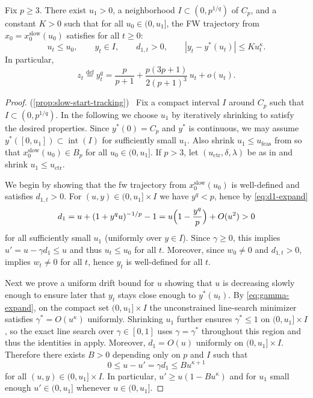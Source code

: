 \documentclass{article}
\newcommand\linktoproof[1]{{\hspace{-0.3em}\normalfont[{\hyperlink{proof:#1}{$\downarrow$}}]}}
\newcommand{\defi}{\stackrel{\mathrm{\scriptscriptstyle def}}{=}}
\newcommand{\newtarget}[1]{\hypertarget{#1}{}}
\newcommand\linkofproof[1]{(\cref{#1})\newtarget{proof:#1}\ }
\begin{document}
\begin{proposition}\label{prop:slow-start-tracking}\linktoproof{prop:slow-start-tracking}
    Fix $p\ge 3$.
    There exist $u_1>0$, a neighborhood $I\subset(0,p^{1/q})$ of $C_p$, and a constant
    $K>0$ such that for all $u_0\in(0,u_1]$, the FW trajectory from
    $x_0=x_0^{\mathrm{slow}}(u_0)$ satisfies for all $t\ge 0$:
    \[
        u_t\le u_0,\qquad y_t\in I,\qquad d_{1,t}>0,
        \qquad
        |y_t-y^*(u_t)| \le K u_t^\kappa.
    \]
    In particular,
    \begin{equation}
        \label{eq:z-drift-slow-start}
        z_t \defi y_t^q
        = \frac{p}{p+1} + \frac{p(3p+1)}{2(p+1)^3}\,u_t + o(u_t).
    \end{equation}
\end{proposition}

\begin{proof}\linkofproof{prop:slow-start-tracking}
    Fix a compact interval $I$ around $C_p$ such that $I\subset(0,p^{1/q})$.
    In the following we choose $u_1$ by iteratively shrinking to satisfy the desired properties.
    Since $y^*(0)=C_p$ and $y^*$ is continuous, we may assume $y^*([0,u_1])\subset \operatorname{int}(I)$ for sufficiently small $u_1$.
    Also shrink $u_1\le u_{\mathrm{feas}}$ from  so
    that $x_0^{\mathrm{slow}}(u_0)\in B_p$ for all $u_0\in(0,u_1]$.
    If $p>3$, let $(u_{\mathrm{ctr}},\delta,\lambda)$ be as in
     and shrink $u_1\le u_{\mathrm{ctr}}$.

    We begin by showing that the \gls{fw} trajectory from $x_0^{\mathrm{slow}}(u_0)$ is well-defined
    and satisfies $d_{1,t}>0$.
    For $(u,y)\in(0,u_1]\times I$ we have $y^q<p$, hence by \eqref{eq:d1-expand}
    \[
        d_1 = u+(1+y^q u)^{-1/p}-1 = u\Bigl(1-\frac{y^q}{p}\Bigr)+O(u^2)>0
    \]
    for all sufficiently small $u_1$ (uniformly over $y\in I$).
    Since $\gamma\ge 0$, this implies $u' = u-\gamma d_1 \le u$ and thus
    $u_t\le u_0$ for all $t$.
    Moreover, since $w_0\neq 0$ and $d_{1,t}>0$,  implies
    $w_t\neq 0$ for all $t$, hence $y_t$ is well-defined for all $t$.

    Next we prove a uniform drift bound for $u$ showing that $u$ is decreasing slowly enough to ensure later that $y_t$ stays close enough to $y^*(u_t)$.
    By \eqref{eq:gamma-expand}, on the compact set $(0,u_1]\times I$ the unconstrained line-search minimizer satisfies $\gamma^*=O(u^\kappa)$ uniformly.
    Shrinking $u_1$ further ensures $\gamma^*\le 1$ on $(0,u_1]\times I$, so the
    exact line search over $\gamma\in[0,1]$ uses $\gamma=\gamma^*$ throughout
    this region and thus the identities in  apply.
    Moreover, $d_1=O(u)$ uniformly on $(0,u_1]\times I$.
    Therefore there exists $B>0$ depending only on $p$ and $I$ such that
    \begin{equation}\label{eq:u-drift-bound}
        0 \le u-u' = \gamma d_1 \le B u^{\kappa+1}
    \end{equation}
    for all $(u,y)\in(0,u_1]\times I$.
    In particular, $u' \ge u(1-Bu^\kappa)$ and for $u_1$ small enough
    $u'\in(0,u_1]$ whenever $u\in(0,u_1]$.


\end{proof}
\end{document}
